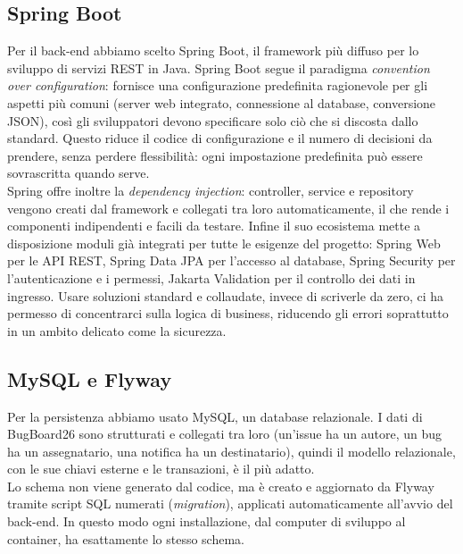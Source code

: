 \subsection{Spring Boot}
Per il back-end abbiamo scelto Spring Boot, il framework più diffuso per lo sviluppo di servizi REST in Java. Spring Boot segue il paradigma \textit{convention over configuration}: fornisce una configurazione predefinita ragionevole per gli aspetti più comuni (server web integrato, connessione al database, conversione JSON), così gli sviluppatori devono specificare solo ciò che si discosta dallo standard. Questo riduce il codice di configurazione e il numero di decisioni da prendere, senza perdere flessibilità: ogni impostazione predefinita può essere sovrascritta quando serve. \\
\indent Spring offre inoltre la \textit{dependency injection}: controller, service e repository vengono creati dal framework e collegati tra loro automaticamente, il che rende i componenti indipendenti e facili da testare. Infine il suo ecosistema mette a disposizione moduli già integrati per tutte le esigenze del progetto: Spring Web per le API REST, Spring Data JPA per l'accesso al database, Spring Security per l'autenticazione e i permessi, Jakarta Validation per il controllo dei dati in ingresso. Usare soluzioni standard e collaudate, invece di scriverle da zero, ci ha permesso di concentrarci sulla logica di business, riducendo gli errori soprattutto in un ambito delicato come la sicurezza.

\subsection{MySQL e Flyway}
Per la persistenza abbiamo usato MySQL, un database relazionale. I dati di BugBoard26 sono strutturati e collegati tra loro (un'issue ha un autore, un bug ha un assegnatario, una notifica ha un destinatario), quindi il modello relazionale, con le sue chiavi esterne e le transazioni, è il più adatto. \\
\indent Lo schema non viene generato dal codice, ma è creato e aggiornato da Flyway tramite script SQL numerati (\textit{migration}), applicati automaticamente all'avvio del back-end. In questo modo ogni installazione, dal computer di sviluppo al container, ha esattamente lo stesso schema.

